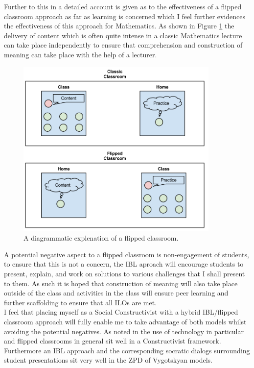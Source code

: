\documentclass[a4paper,12pt]{article}
\begin{document}
Further to this in \cite{Bates} a detailed account is given as to the effectiveness of a flipped classroom approach as far as learning is concerned which I feel further evidences the effectiveness of this approach for Mathematics. As shown in Figure \ref{flipped_classroom} the delivery of content which is often quite intense in a classic Mathematics lecture can take place independently to ensure that comprehension and construction of meaning can take place with the help of a lecturer.\\

\begin{figure}[htdp]
    \begin{center}
        \includegraphics[width=10cm]{Images/flipped_classroom_diagram.png}
    \end{center}
    \caption{A diagrammatic explenation of a flipped classroom.}
    \label{flipped_classroom}
\end{figure}

A potential negative aspect to a flipped classroom is non-engagement of students, to ensure that this is not a concern, the IBL aproach will encourage students to present, explain, and work on solutions to various challenges that I shall present to them. As such it is hoped that construction of meaning will also take place outside of the class and activities in the class will ensure peer learning and further scaffolding to ensure that all ILOs are met.\\

I feel that placing myself as a Social Constructivist with a hybrid IBL/flipped classroom approach will fully enable me to take advantage of both models whilst avoiding the potential negatives. As noted in \cite{Kember2007a} the use of technology in particular and flipped classrooms in general sit well in a Constructivist framework. Furthermore an IBL approach and the corresponding socratic dialogs surrounding student presentations sit very well in the ZPD of Vygotskyan models.\\
\end{document}
